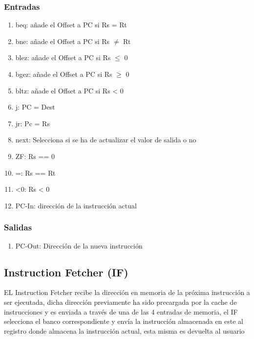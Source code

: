 \documentclass{article}
\begin{document}
            \subsubsection{Entradas}
            \begin{enumerate}
                \item beq: a\~nade el Offset a PC si Rs = Rt
                \item bne: a\~nade el Offset a PC si Rs $\not =$ Rt
                \item blez: a\~nade el Offset a PC si Rs $\leq$ 0
                \item bgez: a\~nade el Offset a PC si Rs $\geq$ 0
                \item bltz: a\~nade el Offset a PC si Rs < 0
                \item j: PC = Dest
                \item jr: Pc = Rs
                \item next: Selecciona si se ha de actualizar el valor de salida o no
                \item ZF: Rs == 0
                \item =: Rs == Rt
                \item <0: Rs < 0 
                \item PC-In: direcci\'on de la instrucci\'on actual
            \end{enumerate}
            
            \subsubsection{Salidas}
            \begin{enumerate}
                \item PC-Out: Direcci\'on de la nueva instrucci\'on
            \end{enumerate}    

        \subsection{Instruction Fetcher (IF)} 
        \label{sec:IF}
            EL Instruction Fetcher recibe la direcci\'on en memoria de la pr\'oxima instrucci\'on a ser ejecutada, dicha direcci\'on previamente ha sido precargada 
            por la cache de instrucciones y es enviada a trav\'es de una de las 4 entradas de memoria, el IF selecciona el banco correspondiente y env\'ia la instrucci\'on almacenada en este al registro donde almacena la instrucci\'on actual, esta misma es devuelta al usuario
\end{document}
